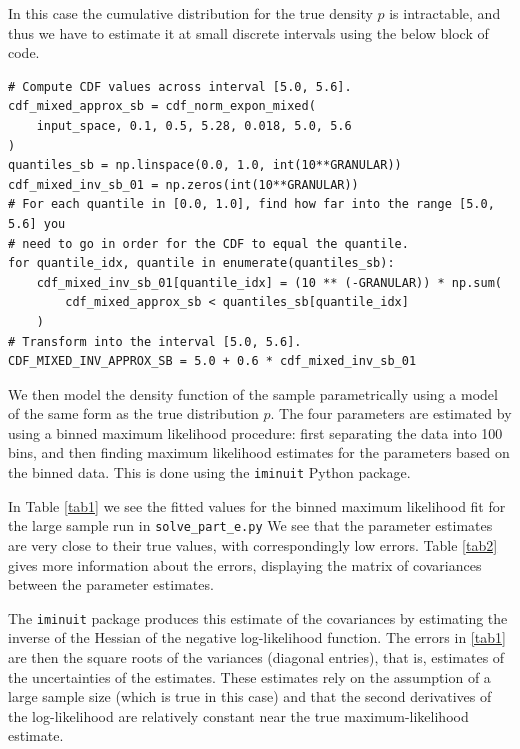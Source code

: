 \documentclass[12pt]{article}
\begin{document}
In this case the cumulative distribution for the true density $p$ is intractable, and thus we have to estimate it at small discrete intervals using the below block of code.

\begin{lstlisting}[caption=Code block producing array of values for inverse CDF of $p$ (e).]
# Compute CDF values across interval [5.0, 5.6].
cdf_mixed_approx_sb = cdf_norm_expon_mixed(
    input_space, 0.1, 0.5, 5.28, 0.018, 5.0, 5.6
)
quantiles_sb = np.linspace(0.0, 1.0, int(10**GRANULAR))
cdf_mixed_inv_sb_01 = np.zeros(int(10**GRANULAR))
# For each quantile in [0.0, 1.0], find how far into the range [5.0, 5.6] you
# need to go in order for the CDF to equal the quantile.
for quantile_idx, quantile in enumerate(quantiles_sb):
    cdf_mixed_inv_sb_01[quantile_idx] = (10 ** (-GRANULAR)) * np.sum(
        cdf_mixed_approx_sb < quantiles_sb[quantile_idx]
    )
# Transform into the interval [5.0, 5.6].
CDF_MIXED_INV_APPROX_SB = 5.0 + 0.6 * cdf_mixed_inv_sb_01
\end{lstlisting}

We then model the density function of the sample parametrically using a model of the same form as the true distribution $p$.
The four parameters are estimated by using a binned maximum likelihood procedure: first separating the data into 100 bins, and then finding maximum likelihood estimates for the parameters based on the binned data.
This is done using the \texttt{iminuit} Python package.

In Table \ref{tab1} we see the fitted values for the binned maximum likelihood fit for the large sample run in \texttt{solve\_part\_e.py}
We see that the parameter estimates are very close to their true values, with correspondingly low errors.
Table \ref{tab2} gives more information about the errors, displaying the matrix of covariances between the parameter estimates.

The \texttt{iminuit} package produces this estimate of the covariances by estimating the inverse of the Hessian of the negative log-likelihood function.
The errors in \ref{tab1} are then the square roots of the variances (diagonal entries), that is, estimates of the uncertainties of the estimates.
These estimates rely on the assumption of a large sample size (which is true in this case) and that the second derivatives of the log-likelihood are relatively constant near the true maximum-likelihood estimate.
\end{document}

